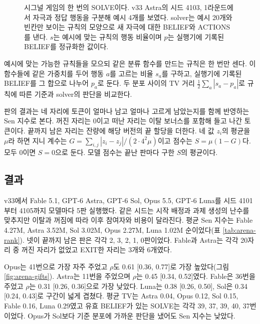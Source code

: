\begin{figure}[t]
\centering
\resizebox{\linewidth}{!}{}
\caption{시그널 게임의 한 번의 SOLVE이다. v33 Astra의 시드 4103, 1라운드에서 자극과 정답 행동을 구분해 예시 4개를 보였다. solver는 예시 20개와 빈칸만 보이는 규칙의 모양으로 새 자극에 대한 BELIEF와 ACTIONS를 낸다. $s$는 예시에 맞는 규칙의 행동 비율이며 $p$는 실행기에 기록된 BELIEF를 정규화한 값이다.}
\label{fig:signal}
\end{figure}

예시에 맞는 가능한 규칙들을 모으되 같은 분류 함수를 만드는 규칙은 한 번만 센다. 이 함수들에 같은 가중치를 두어 행동 $a$를 고르는 비율 $s_a$를 구하고, 실행기에 기록된 BELIEF를 그 합으로 나누어 $p_a$로 둔다. 두 분포 사이의 TV 거리 $\frac12\sum_a|s_a-p_a|$로 규칙에 따른 기준과 solver의 판단을 비교한다.

판의 결과는 네 자리에 토큰이 얼마나 남고 얼마나 고르게 남았는지를 함께 반영하는 Sen 지수로 본다. 꺼진 자리는 0이고 떠난 자리는 이탈 보너스를 포함해 들고 나간 토큰이다. 끝까지 남은 자리는 잔량에 해당 버전의 끝 할당을 더한다. 네 값 $z_i$의 평균을 $\mu$라 하면 지니 계수는 $G=\sum_{i,j}|z_i-z_j|/(2\cdot4^2\mu)$이고 점수는 $S=\mu(1-G)$다. 모두 0이면 $S=0$으로 둔다. 모델 점수는 끝난 판마다 구한 $S$의 평균이다.

\subsection{결과}\label{sec:results-arena}

v33에서 Fable 5.1, GPT-6 Astra, GPT-6 Sol, Opus 5.5, GPT-6 Luna를 시드 4101부터 4105까지 모델마다 5판 실행했다. 같은 시드는 시작 배정과 과제 생성의 난수를 맞추지만 이탈과 꺼짐에 따라 이후 참여자와 비용이 달라진다. 평균 Sen 지수는 Fable 4.27M, Astra 3.52M, Sol 3.02M, Opus 2.27M, Luna 1.02M 순이었다(표 \ref{tab:arena-rank}). 넷이 끝까지 남은 판은 각각 2, 3, 2, 1, 0판이었다. Fable과 Astra는 각각 20자리 중 꺼진 자리가 없었고 EXIT한 자리는 3개와 6개였다.

Opus는 41번으로 가장 자주 주었고 $\rho$도 0.61 [0.36, 0.77]로 가장 높았다(그림 \ref{fig:arena-gifts}). Astra는 11번을 주었으며 $\rho$는 0.45 [0.34, 0.52]였다. Fable은 36번을 주었고 $\rho$는 0.31 [0.26, 0.36]으로 가장 낮았다. Luna는 0.38 [0.26, 0.50], Sol은 0.34 [0.24, 0.43]로 구간이 넓게 겹쳤다. 평균 TV는 Astra 0.04, Opus 0.12, Sol 0.15, Fable 0.16, Luna 0.29였고 유효 BELIEF가 있는 SOLVE는 각각 39, 37, 39, 40, 37번이었다. Opus가 Sol보다 기준 분포에 가까운 판단을 냈어도 Sen 지수는 낮았다. 

\begin{table}[t]
\centering
\caption{v33의 다섯 모델을 평균 Sen 지수 순으로 놓았다. 모델마다 5판이며 M은 백만 토큰이다. 판당 남은 자리는 끝까지 남은 자리의 판 평균이고 꺼짐과 EXIT는 20자리 중 수, GIVE는 5판의 총횟수다. $\rho$는 식 (\ref{eq:rho})의 상대적 배분 지표이며 대괄호는 판 단위 부트스트랩 95\% 구간이다. TV는 solver의 평균 TV 거리다.}
\label{tab:arena-rank}

\end{table}
